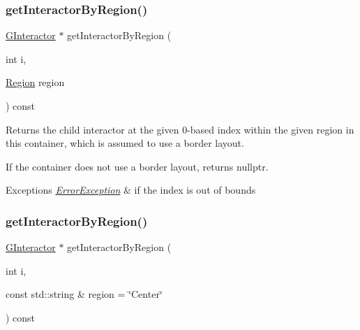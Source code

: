 \subsubsection{\texorpdfstring{get\+Interactor\+By\+Region()}{getInteractorByRegion()}\hspace{0.1cm}{\footnotesize\ttfamily [1/2]}}
{\footnotesize\ttfamily \mbox{\hyperlink{classGInteractor}{G\+Interactor}} $\ast$ get\+Interactor\+By\+Region (\begin{DoxyParamCaption}\item[{int}]{i,  }\item[{\mbox{\hyperlink{classGContainer_a81a01a86de31071a92e6cce0bab9bc4b}{Region}}}]{region }\end{DoxyParamCaption}) const\hspace{0.3cm}{\ttfamily [virtual]}}



Returns the child interactor at the given 0-\/based index within the given region in this container, which is assumed to use a border layout. 

If the container does not use a border layout, returns nullptr. 
\begin{DoxyExceptions}{Exceptions}
{\em \mbox{\hyperlink{classErrorException}{Error\+Exception}}} & if the index is out of bounds \\
\hline
\end{DoxyExceptions}
\mbox{\label{classGContainer_a576bbbb845c9bcf139fca956e3a4c757}} 
\subsubsection{\texorpdfstring{get\+Interactor\+By\+Region()}{getInteractorByRegion()}\hspace{0.1cm}{\footnotesize\ttfamily [2/2]}}
{\footnotesize\ttfamily \mbox{\hyperlink{classGInteractor}{G\+Interactor}} $\ast$ get\+Interactor\+By\+Region (\begin{DoxyParamCaption}\item[{int}]{i,  }\item[{const std\+::string \&}]{region = {\ttfamily \char`\"{}Center\char`\"{}} }\end{DoxyParamCaption}) const\hspace{0.3cm}{\ttfamily [virtual]}}



